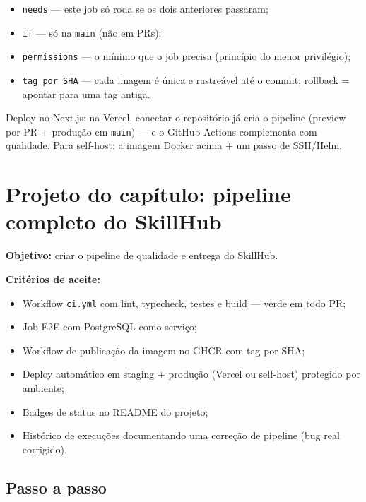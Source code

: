 \begin{itemize}[leftmargin=*, itemsep=0.4em]
  \item \texttt{needs} — este job só roda se os dois anteriores passaram;
  \item \texttt{if} — só na \texttt{main} (não em PRs);
  \item \texttt{permissions} — o mínimo que o job precisa (princípio do menor privilégio);
  \item \texttt{tag por SHA} — cada imagem é única e rastreável até o commit; rollback = apontar para uma tag antiga.
\end{itemize}

\begin{caixadica}
Deploy no Next.js: na Vercel, conectar o repositório já cria o pipeline
(preview por PR + produção em \texttt{main}) — e o GitHub Actions complementa
com qualidade. Para self-host: a imagem Docker acima + um passo de SSH/Helm.
\end{caixadica}

\section{Projeto do capítulo: pipeline completo do SkillHub}
\label{sec:projeto18}

\begin{caixaprojeto}
\textbf{Objetivo:} criar o pipeline de qualidade e entrega do SkillHub.

\textbf{Critérios de aceite:}
\begin{itemize}[leftmargin=*, itemsep=0.2em]
  \item Workflow \texttt{ci.yml} com lint, typecheck, testes e build — verde em todo PR;
  \item Job E2E com PostgreSQL como serviço;
  \item Workflow de publicação da imagem no GHCR com tag por SHA;
  \item Deploy automático em staging + produção (Vercel ou self-host) protegido por ambiente;
  \item Badges de status no README do projeto;
  \item Histórico de execuções documentando uma correção de pipeline (bug real corrigido).
\end{itemize}
\end{caixaprojeto}

\subsection{Passo a passo}


